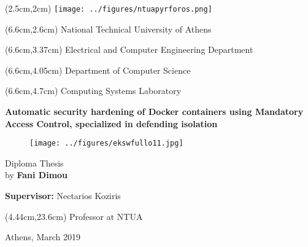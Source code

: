 \thispagestyle{empty}
\begin{textblock*}{6cm}(2.5cm,2cm) %
\texttt{[image: ../figures/ntuapyrforos.png]}
\end{textblock*}

\begingroup
 
\begin{mdseries}  
\begin{textblock*}{103cm}(6.6cm,2.6cm) %
\fontsize{16}{12}\selectfont 
National Technical University of Athens
\end{textblock*}
\fontsize{14}{12}\selectfont
\begin{textblock*}{103cm}(6.6cm,3.37cm)
Electrical and Computer Engineering Department
\end{textblock*}
\begin{textblock*}{103cm}(6.6cm,4.05cm)
Department of Computer Science
\end{textblock*}
\begin{textblock*}{103cm}(6.6cm,4.7cm)
Computing Systems Laboratory
\end{textblock*}

\hfill\break\hfill\break\hfill\break\hfill\break\hfill\break\hfill\break\hfill\break\hfill\break

\fontsize{18}{12}\selectfont
\begin{center}\textbf{Automatic security hardening of Docker containers using Mandatory Access Control, specialized in defending isolation}\end{center}
\hfill\break
\begin{figure}[h!]
  \centering
   \texttt{[image: ../figures/ekswfullo11.jpg]}
\end{figure}
\hfill\break
\fontsize{17}{20.5}\selectfont

\begin{center}
Diploma Thesis
\\
by \textbf{Fani Dimou}
\end{center}

\hfill\break

\hfill\break\hfill\break
\fontsize{13}{12}\selectfont
\textbf{Supervisor:} Nectarios Koziris
\begin{textblock*}{103cm}(4.44cm,23.6cm)
Professor at NTUA
\end{textblock*}

\hfill\break\hfill\break\hfill\break
\begin{center}
Athens, March 2019
\end{center}

\end{mdseries}
\endgroup

\clearpage\null\thispagestyle{empty}
\newpage

